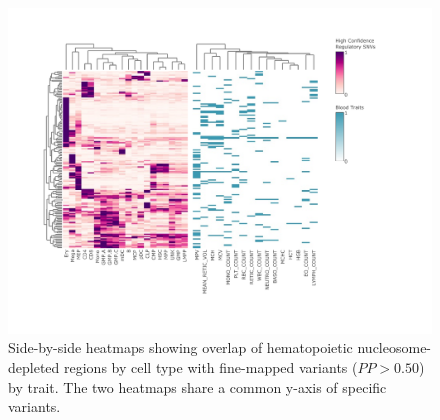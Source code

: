 \documentclass{article}\usepackage[]{graphicx}\usepackage[]{color}
\begin{document}
\begin{figure}
\centering
\includegraphics[width=\linewidth]{staticFigures/UKBB_PP50_bulk.pdf}
\caption{Side-by-side heatmaps showing overlap of hematopoietic nucleosome-depleted regions by cell type with fine-mapped variants ($PP>0.50$) by trait. The two heatmaps share a common y-axis of specific variants.}
\end{figure} 
\end{document}
